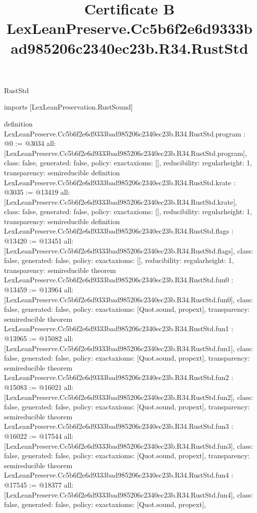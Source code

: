 \begin{lexlean}{RustStd}
\title{Certificate B LexLeanPreserve.Cc5b6f2e6d9333bad985206c2340ec23b.R34.RustStd}
\begin{coremodule}
imports [LexLeanPreservation.RustSound]

definition LexLeanPreserve.Cc5b6f2e6d9333bad985206c2340ec23b.R34.RustStd.program : @0 := @3034 {
  all: [LexLeanPreserve.Cc5b6f2e6d9333bad985206c2340ec23b.R34.RustStd.program],
  class: false,
  generated: false,
  policy: exact{axioms: []},
  reducibility: regular{height: 1},
  transparency: semireducible
}
definition LexLeanPreserve.Cc5b6f2e6d9333bad985206c2340ec23b.R34.RustStd.krate : @3035 := @13419 {
  all: [LexLeanPreserve.Cc5b6f2e6d9333bad985206c2340ec23b.R34.RustStd.krate],
  class: false,
  generated: false,
  policy: exact{axioms: []},
  reducibility: regular{height: 1},
  transparency: semireducible
}
definition LexLeanPreserve.Cc5b6f2e6d9333bad985206c2340ec23b.R34.RustStd.flags : @13420 := @13451 {
  all: [LexLeanPreserve.Cc5b6f2e6d9333bad985206c2340ec23b.R34.RustStd.flags],
  class: false,
  generated: false,
  policy: exact{axioms: []},
  reducibility: regular{height: 1},
  transparency: semireducible
}
theorem LexLeanPreserve.Cc5b6f2e6d9333bad985206c2340ec23b.R34.RustStd.fun0 : @13459 := @13964 {
  all: [LexLeanPreserve.Cc5b6f2e6d9333bad985206c2340ec23b.R34.RustStd.fun0],
  class: false,
  generated: false,
  policy: exact{axioms: [Quot.sound, propext]},
  transparency: semireducible
}
theorem LexLeanPreserve.Cc5b6f2e6d9333bad985206c2340ec23b.R34.RustStd.fun1 : @13965 := @15082 {
  all: [LexLeanPreserve.Cc5b6f2e6d9333bad985206c2340ec23b.R34.RustStd.fun1],
  class: false,
  generated: false,
  policy: exact{axioms: [Quot.sound, propext]},
  transparency: semireducible
}
theorem LexLeanPreserve.Cc5b6f2e6d9333bad985206c2340ec23b.R34.RustStd.fun2 : @15083 := @16021 {
  all: [LexLeanPreserve.Cc5b6f2e6d9333bad985206c2340ec23b.R34.RustStd.fun2],
  class: false,
  generated: false,
  policy: exact{axioms: [Quot.sound, propext]},
  transparency: semireducible
}
theorem LexLeanPreserve.Cc5b6f2e6d9333bad985206c2340ec23b.R34.RustStd.fun3 : @16022 := @17544 {
  all: [LexLeanPreserve.Cc5b6f2e6d9333bad985206c2340ec23b.R34.RustStd.fun3],
  class: false,
  generated: false,
  policy: exact{axioms: [Quot.sound, propext]},
  transparency: semireducible
}
theorem LexLeanPreserve.Cc5b6f2e6d9333bad985206c2340ec23b.R34.RustStd.fun4 : @17545 := @18377 {
  all: [LexLeanPreserve.Cc5b6f2e6d9333bad985206c2340ec23b.R34.RustStd.fun4],
  class: false,
  generated: false,
  policy: exact{axioms: [Quot.sound, propext]},
}
\end{coremodule}
\end{lexlean}
